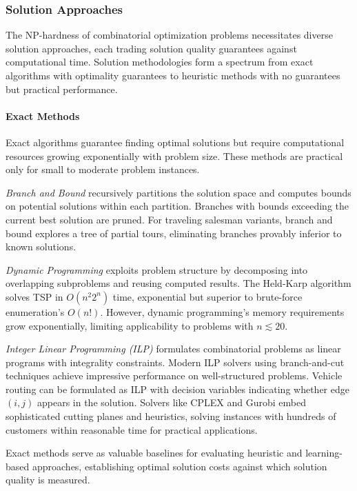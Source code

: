 \subsubsection{Solution Approaches}

The NP-hardness of combinatorial optimization problems necessitates diverse solution approaches, each trading solution quality guarantees against computational time. Solution methodologies form a spectrum from exact algorithms with optimality guarantees to heuristic methods with no guarantees but practical performance.

\paragraph{Exact Methods}

Exact algorithms guarantee finding optimal solutions but require computational resources growing exponentially with problem size. These methods are practical only for small to moderate problem instances.

\textit{Branch and Bound} recursively partitions the solution space and computes bounds on potential solutions within each partition. Branches with bounds exceeding the current best solution are pruned. For traveling salesman variants, branch and bound explores a tree of partial tours, eliminating branches provably inferior to known solutions.

\textit{Dynamic Programming} exploits problem structure by decomposing into overlapping subproblems and reusing computed results. The Held-Karp algorithm solves TSP in $O(n^2 2^n)$ time, exponential but superior to brute-force enumeration's $O(n!)$. However, dynamic programming's memory requirements grow exponentially, limiting applicability to problems with $n \lesssim 20$.

\textit{Integer Linear Programming (ILP)} formulates combinatorial problems as linear programs with integrality constraints. Modern ILP solvers using branch-and-cut techniques achieve impressive performance on well-structured problems. Vehicle routing can be formulated as ILP with decision variables indicating whether edge $(i,j)$ appears in the solution. Solvers like CPLEX and Gurobi embed sophisticated cutting planes and heuristics, solving instances with hundreds of customers within reasonable time for practical applications.

Exact methods serve as valuable baselines for evaluating heuristic and learning-based approaches, establishing optimal solution costs against which solution quality is measured.


